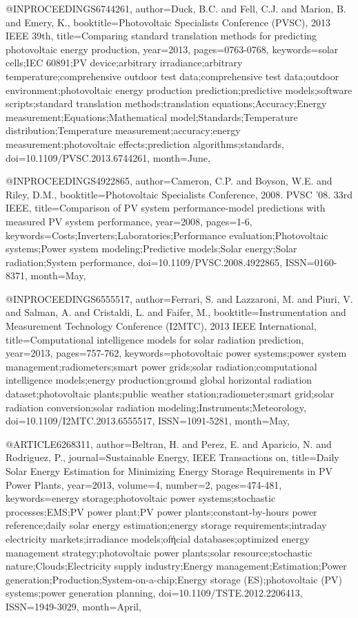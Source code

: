 @INPROCEEDINGS{6744261, 
author={Duck, B.C. and Fell, C.J. and Marion, B. and Emery, K.}, 
booktitle={Photovoltaic Specialists Conference (PVSC), 2013 IEEE 39th}, 
title={Comparing standard translation methods for predicting photovoltaic energy production}, 
year={2013}, 
pages={0763-0768}, 
keywords={solar cells;IEC 60891;PV device;arbitrary irradiance;arbitrary temperature;comprehensive outdoor test data;comprehensive test data;outdoor environment;photovoltaic energy production prediction;predictive models;software scripts;standard translation methods;translation equations;Accuracy;Energy measurement;Equations;Mathematical model;Standards;Temperature distribution;Temperature measurement;accuracy;energy measurement;photovoltaic effects;prediction algorithms;standards}, 
doi={10.1109/PVSC.2013.6744261}, 
month={June},}

@INPROCEEDINGS{4922865, 
author={Cameron, C.P. and Boyson, W.E. and Riley, D.M.}, 
booktitle={Photovoltaic Specialists Conference, 2008. PVSC '08. 33rd IEEE}, 
title={Comparison of PV system performance-model predictions with measured PV system performance}, 
year={2008}, 
pages={1-6}, 
keywords={Costs;Inverters;Laboratories;Performance evaluation;Photovoltaic systems;Power system modeling;Predictive models;Solar energy;Solar radiation;System performance}, 
doi={10.1109/PVSC.2008.4922865}, 
ISSN={0160-8371}, 
month={May},}

@INPROCEEDINGS{6555517, 
author={Ferrari, S. and Lazzaroni, M. and Piuri, V. and Salman, A. and Cristaldi, L. and Faifer, M.}, 
booktitle={Instrumentation and Measurement Technology Conference (I2MTC), 2013 IEEE International}, 
title={Computational intelligence models for solar radiation prediction}, 
year={2013}, 
pages={757-762}, 
keywords={photovoltaic power systems;power system management;radiometers;smart power grids;solar radiation;computational intelligence models;energy production;ground global horizontal radiation dataset;photovoltaic plants;public weather station;radiometer;smart grid;solar radiation conversion;solar radiation modeling;Instruments;Meteorology}, 
doi={10.1109/I2MTC.2013.6555517}, 
ISSN={1091-5281}, 
month={May},}

@ARTICLE{6268311, 
author={Beltran, H. and Perez, E. and Aparicio, N. and Rodriguez, P.}, 
journal={Sustainable Energy, IEEE Transactions on}, 
title={Daily Solar Energy Estimation for Minimizing Energy Storage Requirements in PV Power Plants}, 
year={2013}, 
volume={4}, 
number={2}, 
pages={474-481}, 
keywords={energy storage;photovoltaic power systems;stochastic processes;EMS;PV power plant;PV power plants;constant-by-hours power reference;daily solar energy estimation;energy storage requirements;intraday electricity markets;irradiance models;ofήcial databases;optimized energy management strategy;photovoltaic power plants;solar resource;stochastic nature;Clouds;Electricity supply industry;Energy management;Estimation;Power generation;Production;System-on-a-chip;Energy storage (ES);photovoltaic (PV) systems;power generation planning}, 
doi={10.1109/TSTE.2012.2206413}, 
ISSN={1949-3029}, 
month={April},}


